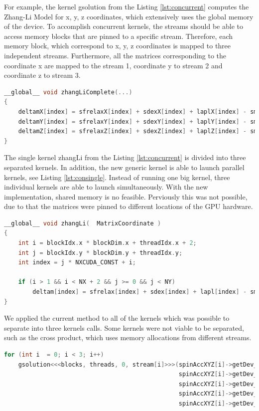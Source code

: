 For example, the kernel {\listf gsolution} from the Listing \ref{lst:concurrent} computes the Zhang-Li Model for x, y, z coordinates, which extensively uses the global memory of the device. To accomplish concurrent kernels, the streams should be able to access memory blocks that are pinned to a specific stream. Therefore, each memory block, which correspond to x, y, z coordinates is mapped to three independent streams. Furthermore, all the matrices corresponding to the coordinate x are mapped to the stream 1, coordinate y to stream 2 and coordinate z to stream 3.

\begin{lstlisting}[language=C++, label={lst:concurrent}, caption={Evaluation of x, y, z coordinates of the Zhang-Li Model in a single kernel.}]
__global__ void zhangLiComplete(...)
{
	deltamX[index] = sfrelaxX[index] + sdexX[index] + laplX[index] - smX[index];
	deltamY[index] = sfrelaxY[index] + sdexY[index] + laplY[index] - smY[index];
	deltamZ[index] = sfrelaxZ[index] + sdexZ[index] + laplZ[index] - smZ[index];
}
\end{lstlisting}
 
The single kernel {\listf zhangLi} from the Listing \ref{lst:concurrent} is divided into three separated kernels. In addition, the new generic kernel is able to launch parallel kernels, see Listing \ref{lst:consingle}. Instead of running one big kernel, three individual kernels are able to launch simultaneously. With the new implementation, shared memory is no feasible. Perviously this was not possible, due to that the matrices were pinned to different locations of the GPU hardware. 

\begin{lstlisting}[language=C++, label={lst:consingle}, caption={Evaluation of individual coordinates of the Zhang-Li Model.}]
__global__ void zhangLi(  MatrixCoordinate )
{
	int i = blockIdx.x * blockDim.x + threadIdx.x + 2;
	int j = blockIdx.y * blockDim.y + threadIdx.y;
	int index = j * NXCUDA_CONST + i;

	if (i > 1 && i < NX + 2 && j >= 0 && j < NY)
		deltam[index] = sfrelax[index] + sdex[index] + lapl[index] - sm[index];
}
\end{lstlisting}

We applied the current method to all of the kernels which was possible to separate into three kernels calls. Some kernels were not viable to be separated, such as the cross product, which uses memory allocations from different streams.

\begin{lstlisting}[language=C++, caption={Evaluate Zhang-Li Model.}]
for (int i  = 0; i < 3; i++)
	gsolution<<<blocks, threads, 0, stream[i]>>>(spinAccXYZ[i]->getDev_deltam(),
												 spinAccXYZ[i]->getDev_sfrelax(), 
												 spinAccXYZ[i]->getDev_sm(), 
											 	 spinAccXYZ[i]->getDev_sdex(),
											 	 spinAccXYZ[i]->getDev_lapl());
\end{lstlisting}

